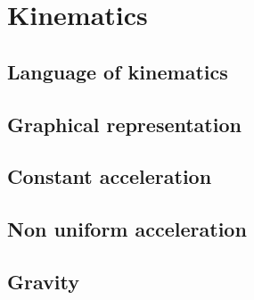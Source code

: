 \chapter{Kinematics}
\section{Language of kinematics}
\section{Graphical representation}
\section{Constant acceleration}
\section{Non uniform acceleration}
\section{Gravity}